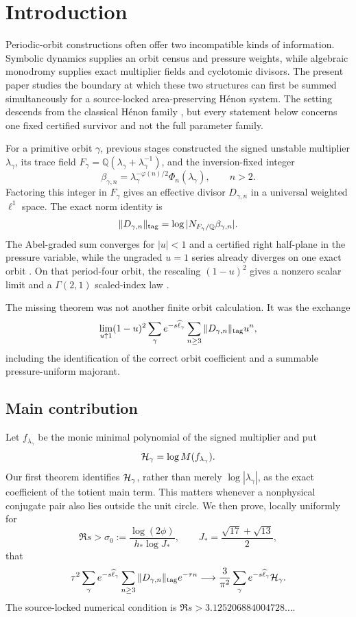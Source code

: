 \section{Introduction}

Periodic-orbit constructions often offer two incompatible kinds of
information.  Symbolic dynamics supplies an orbit census and pressure
weights, while algebraic monodromy supplies exact multiplier fields and
cyclotomic divisors.  The present paper studies the boundary at which these
two structures can first be summed simultaneously for a source-locked
area-preserving H\'enon system.  The setting descends from the classical
H\'enon family \citep{Henon1976}, but every statement below concerns one
fixed certified survivor and not the full parameter family.

For a primitive orbit $\gamma$, previous stages constructed the signed
unstable multiplier $\lambda_\gamma$, its trace field
$F_\gamma=\mathbb Q(\lambda_\gamma+\lambda_\gamma^{-1})$, and the
inversion-fixed integer
\[
 \beta_{\gamma,n}
 =\lambda_\gamma^{-\varphi(n)/2}\Phi_n(\lambda_\gamma),
 \qquad n>2.
\]
Factoring this integer in $F_\gamma$ gives an effective divisor
$D_{\gamma,n}$ in a universal weighted $\ell^1$ space.  The exact norm
identity is
\[
 \|D_{\gamma,n}\|_{\rm tag}
 =\log|N_{F_\gamma/\mathbb Q}\beta_{\gamma,n}|.
\]
The Abel-graded sum converges for $|u|<1$ and a certified right half-plane in
the pressure variable, while the ungraded $u=1$ series already diverges on
one exact orbit \citep{WangP51}.  On that period-four orbit, the rescaling
$(1-u)^2$ gives a nonzero scalar limit and a $\Gamma(2,1)$ scaled-index law
\citep{WangP52}.

The missing theorem was not another finite orbit calculation.  It was the
exchange
\[
 \lim_{u\uparrow1}(1-u)^2
 \sum_\gamma e^{-s\widehat\ell_\gamma}
 \sum_{n\ge3}\|D_{\gamma,n}\|_{
 \rm tag}u^n,
\]
including the identification of the correct orbit coefficient and a
summable pressure-uniform majorant.

\subsection{Main contribution}

Let $f_{\lambda_\gamma}$ be the monic minimal polynomial of the signed
multiplier and put
\[
 \mathcal H_\gamma=\log M(f_{\lambda_\gamma}).
\]
Our first theorem identifies $\mathcal H_\gamma$, rather than merely
$\log|\lambda_\gamma|$, as the exact coefficient of the totient main term.
This matters whenever a nonphysical conjugate pair also lies outside the
unit circle.  We then prove, locally uniformly for
\[
 \Re s>\sigma_0
 :=\frac{\log(2\phi)}{h_*\log J_*},
 \qquad J_*=\frac{\sqrt{17}+\sqrt{13}}2,
\]
that
\begin{equation}
 \tau^2\sum_\gamma e^{-s\widehat\ell_\gamma}
 \sum_{n\ge3}\|D_{\gamma,n}\|_{\rm tag}e^{-\tau n}
 \longrightarrow
 \frac3{\pi^2}\sum_\gamma
 e^{-s\widehat\ell_\gamma}\mathcal H_\gamma.
 \label{eq:intro-main}
\end{equation}
The source-locked numerical condition is
$\Re s>3.125206884004728\ldots$.

